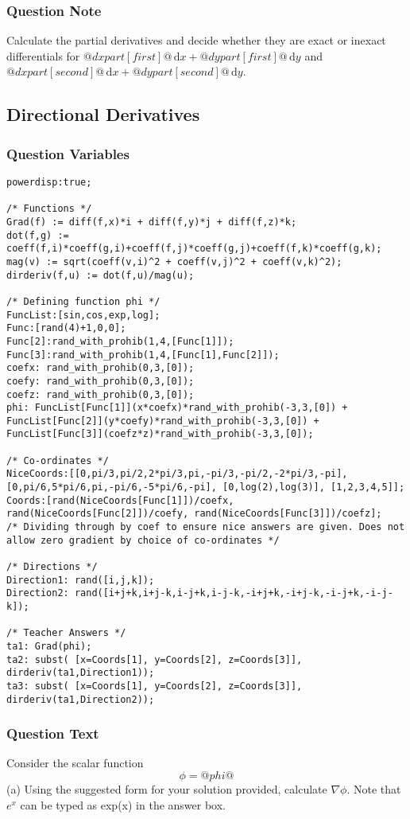 \documentclass[a4paper,10pt]{article}
\begin{document}
\subsubsection{Question Note}
Calculate the partial derivatives and decide whether they are exact or inexact differentials for \(@dxpart[first]@ \, \text{d}x + @dypart[first]@ \, \text{d}y\)  and \(@dxpart[second]@ \, \text{d}x + @dypart[second]@ \, \text{d}y\).

\subsection{Directional Derivatives}
\subsubsection{Question Variables}
\begin{lstlisting}
powerdisp:true;

/* Functions */
Grad(f) := diff(f,x)*i + diff(f,y)*j + diff(f,z)*k;
dot(f,g) := coeff(f,i)*coeff(g,i)+coeff(f,j)*coeff(g,j)+coeff(f,k)*coeff(g,k);
mag(v) := sqrt(coeff(v,i)^2 + coeff(v,j)^2 + coeff(v,k)^2);
dirderiv(f,u) := dot(f,u)/mag(u);

/* Defining function phi */
FuncList:[sin,cos,exp,log];
Func:[rand(4)+1,0,0];
Func[2]:rand_with_prohib(1,4,[Func[1]]);
Func[3]:rand_with_prohib(1,4,[Func[1],Func[2]]);
coefx: rand_with_prohib(0,3,[0]);
coefy: rand_with_prohib(0,3,[0]);
coefz: rand_with_prohib(0,3,[0]);
phi: FuncList[Func[1]](x*coefx)*rand_with_prohib(-3,3,[0]) + FuncList[Func[2]](y*coefy)*rand_with_prohib(-3,3,[0]) + FuncList[Func[3]](coefz*z)*rand_with_prohib(-3,3,[0]);

/* Co-ordinates */
NiceCoords:[[0,pi/3,pi/2,2*pi/3,pi,-pi/3,-pi/2,-2*pi/3,-pi],[0,pi/6,5*pi/6,pi,-pi/6,-5*pi/6,-pi], [0,log(2),log(3)], [1,2,3,4,5]];
Coords:[rand(NiceCoords[Func[1]])/coefx, rand(NiceCoords[Func[2]])/coefy, rand(NiceCoords[Func[3]])/coefz];      /* Dividing through by coef to ensure nice answers are given. Does not allow zero gradient by choice of co-ordinates */

/* Directions */
Direction1: rand([i,j,k]);
Direction2: rand([i+j+k,i+j-k,i-j+k,i-j-k,-i+j+k,-i+j-k,-i-j+k,-i-j-k]);

/* Teacher Answers */
ta1: Grad(phi);
ta2: subst( [x=Coords[1], y=Coords[2], z=Coords[3]], dirderiv(ta1,Direction1));
ta3: subst( [x=Coords[1], y=Coords[2], z=Coords[3]], dirderiv(ta1,Direction2));
\end{lstlisting}
\subsubsection{Question Text}
Consider the scalar function \[\phi = @phi@\](a) Using the suggested form for your solution provided, calculate \(\nabla \phi\). Note that \(e^{x}\) can be typed as exp(x) in the answer box.
\end{document}
